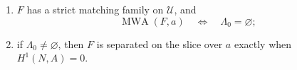 \begin{theorem}
\begin{enumerate}[label=(\roman*),nosep]
      set under \(H^1(N,A)\).  Consequently, a finite marked set
      \(m:E\to\Lambda\) occurs as the terminal source-component set of such
      a realization if and only if
      \[
      m^{-1}(\lambda)=\varnothing
      \quad(\lambda\notin\Lambda_0),
      \qquad
      |m^{-1}(\lambda)|=|H^1(N,A)|
      \quad(\lambda\in\Lambda_0);
      \]
\item \(F\) has a strict matching family on \(\mathcal U\), and
      \[
      \operatorname{MWA}(F,a)
      \quad\Longleftrightarrow\quad
      \Lambda_0=\varnothing;
      \]
\item if \(\Lambda_0\ne\varnothing\), then \(F\) is separated on the slice
      over \(a\) exactly when \(H^1(N,A)=0\).
\end{enumerate}
\end{theorem}

